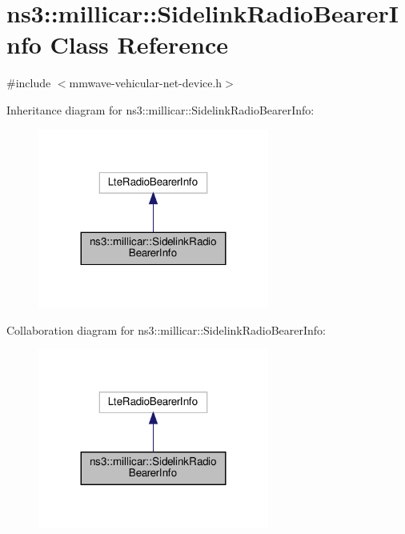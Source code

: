 \hypertarget{classns3_1_1millicar_1_1SidelinkRadioBearerInfo}{}\section{ns3\+:\+:millicar\+:\+:Sidelink\+Radio\+Bearer\+Info Class Reference}
\label{classns3_1_1millicar_1_1SidelinkRadioBearerInfo}


{\ttfamily \#include $<$mmwave-\/vehicular-\/net-\/device.\+h$>$}



Inheritance diagram for ns3\+:\+:millicar\+:\+:Sidelink\+Radio\+Bearer\+Info\+:
\nopagebreak
\begin{figure}[H]
\begin{center}
\leavevmode
\includegraphics[width=215pt]{classns3_1_1millicar_1_1SidelinkRadioBearerInfo__inherit__graph}
\end{center}
\end{figure}


Collaboration diagram for ns3\+:\+:millicar\+:\+:Sidelink\+Radio\+Bearer\+Info\+:
\nopagebreak
\begin{figure}[H]
\begin{center}
\leavevmode
\includegraphics[width=215pt]{classns3_1_1millicar_1_1SidelinkRadioBearerInfo__coll__graph}
\end{center}
\end{figure}

